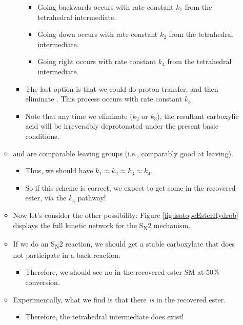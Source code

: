 \documentclass[../notes.tex]{subfiles}
\begin{document}
\begin{itemize}
\begin{itemize}
\begin{itemize}
            \begin{itemize}
                \item Going backwards occurs with rate constant $k_1$ from the tetrahedral intermediate.
                \item Going down occurs with rate constant $k_2$ from the tetrahedral intermediate.
                \item Going right occurs with rate constant $k_4$ from the tetrahedral intermediate.
            \end{itemize}
            \item The last option is that we could do proton transfer, and then eliminate . This process occurs with rate constant $k_3$.
            \item Note that any time we eliminate  ($k_2$ or $k_3$), the resultant carboxylic acid will be irreversibly deprotonated under the present basic conditions.
        \end{itemize}
        \item {} and  are comparable leaving groups (i.e., comparably good at leaving).
        \begin{itemize}
            \item Thus, we should have $k_1\approx k_2\approx k_3\approx k_4$.
            \item So if this scheme is correct, we expect to get some  in the recovered ester, via the $k_4$ pathway!
        \end{itemize}
        \item Now let's consider the other possibility: Figure \ref{fig:isotopeEsterHydrob} displays the full kinetic network for the S\textsubscript{N}2 mechanism.
        \item If we do an S\textsubscript{N}2 reaction, we should get a stable carboxylate that does not participate in a back reaction.
        \begin{itemize}
            \item Therefore, we should see no  in the recovered ester SM at 50\% conversion.
        \end{itemize}
        \item Experimentally, what we find is that there \emph{is}  in the recovered ester.
        \begin{itemize}
            \item Therefore, the tetrahedral intermediate does exist!
        \end{itemize}

\end{itemize}
\end{itemize}
\end{document}
